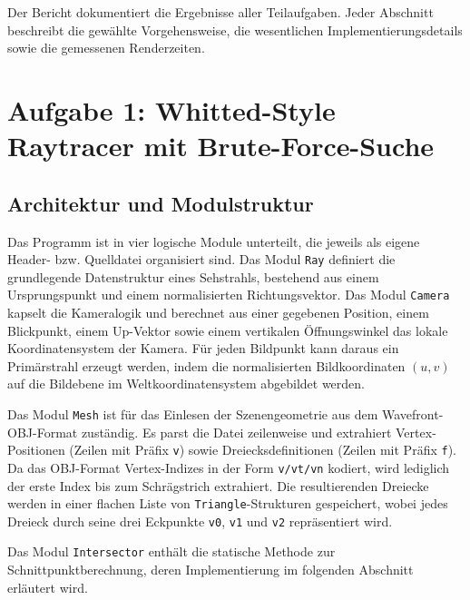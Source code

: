 \documentclass[11pt, a4paper]{article}
\begin{document}
Der Bericht dokumentiert die Ergebnisse aller Teilaufgaben. Jeder Abschnitt beschreibt die gewählte Vorgehensweise, die wesentlichen Implementierungsdetails sowie die gemessenen Renderzeiten.

\section{Aufgabe 1: Whitted-Style Raytracer mit Brute-Force-Suche}

\subsection{Architektur und Modulstruktur}

Das Programm ist in vier logische Module unterteilt, die jeweils als eigene Header- bzw. Quelldatei organisiert sind. Das Modul \texttt{Ray} definiert die grundlegende Datenstruktur eines Sehstrahls, bestehend aus einem Ursprungspunkt und einem normalisierten Richtungsvektor. Das Modul \texttt{Camera} kapselt die Kameralogik und berechnet aus einer gegebenen Position, einem Blickpunkt, einem Up-Vektor sowie einem vertikalen Öffnungswinkel das lokale Koordinatensystem der Kamera. Für jeden Bildpunkt kann daraus ein Primärstrahl erzeugt werden, indem die normalisierten Bildkoordinaten $(u, v)$ auf die Bildebene im Weltkoordinatensystem abgebildet werden.

Das Modul \texttt{Mesh} ist für das Einlesen der Szenengeometrie aus dem Wavefront-OBJ-Format zuständig. Es parst die Datei zeilenweise und extrahiert Vertex-Positionen (Zeilen mit Präfix \texttt{v}) sowie Dreiecksdefinitionen (Zeilen mit Präfix \texttt{f}). Da das OBJ-Format Vertex-Indizes in der Form \texttt{v/vt/vn} kodiert, wird lediglich der erste Index bis zum Schrägstrich extrahiert. Die resultierenden Dreiecke werden in einer flachen Liste von \texttt{Triangle}-Strukturen gespeichert, wobei jedes Dreieck durch seine drei Eckpunkte \texttt{v0}, \texttt{v1} und \texttt{v2} repräsentiert wird.

Das Modul \texttt{Intersector} enthält die statische Methode zur Schnittpunktberechnung, deren Implementierung im folgenden Abschnitt erläutert wird.
\end{document}
